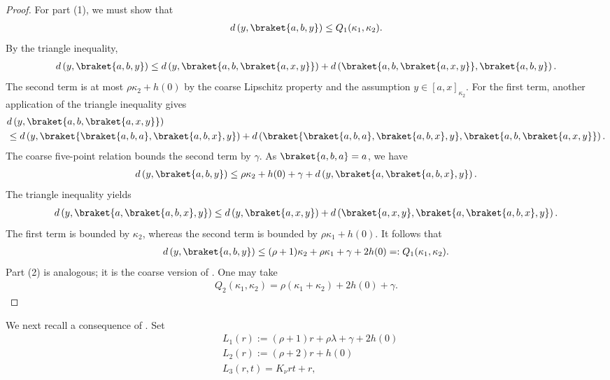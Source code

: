 \documentclass[12pt,reqno]{amsart}
\numberwithin{equation}{section}
\begin{document}
\begin{proof}
    For part (1), we must show that
    \begin{align*}
        d\left(y,\braket{a,b,y}\right)\le Q_1(\kappa_1,\kappa_2).
    \end{align*}
    By the triangle inequality, 
    \begin{align*}
        d\left(y,\braket{a,b,y}\right)\le d\left(y, \braket{a,b,\braket{a,x,y}}\right)+d\left(\braket{a,b,\braket{a,x,y}},\braket{a,b,y}\right).
    \end{align*}
    The second term is at most $\rho\kappa_2+h(0)$ by the coarse Lipschitz property and the assumption $y\in[a,x]_{\kappa_2}$. For the first term, another application of the triangle inequality gives
    \begin{align*}
        &d\left(y, \braket{a,b,\braket{a,x,y}}\right)\\
        &\le d\left(y, \braket{\braket{a,b,a},\braket{a,b,x},y}\right)+d\left(\braket{\braket{a,b,a},\braket{a,b,x},y},\braket{a,b,\braket{a,x,y}}\right).
    \end{align*}
    The coarse five-point relation bounds the second term by $\gamma$. As $\braket{a,b,a}=a$, we have
    \begin{align*}
        d\left(y,\braket{a,b,y}\right)\le \rho \kappa_2+h(0)+\gamma+d\left(y, \braket{a,\braket{a,b,x},y}\right).
    \end{align*}
    The triangle inequality yields
    \begin{align*}
        d\left(y, \braket{a,\braket{a,b,x},y}\right)\le d\left(y, \braket{a,x,y}\right)+d\left(\braket{a,x,y},\braket{a,\braket{a,b,x},y}\right).
    \end{align*}
    The first term is bounded by $\kappa_2$, whereas the second term is bounded by $\rho \kappa_1+h(0)$. It follows that
    \begin{align*}
         d\left(y,\braket{a,b,y}\right)\le (\rho+1)\kappa_2+\rho\kappa_1+\gamma+2h(0)=: Q_1(\kappa_1,\kappa_2).
    \end{align*}
    Part (2) is analogous; it is the coarse version of \cite[Lemma 5.4]{SpakulaWright2017propertyA}. One may take
    \begin{align*}
        Q_2(\kappa_1,\kappa_2)=\rho(\kappa_1+\kappa_2)+2h(0)+\gamma.
    \end{align*}
\end{proof}
We next recall a consequence of \cite{SpakulaWright2017propertyA}. Set
\begin{align*}
    &L_1(r):=(\rho+1)r+\rho \lambda+\gamma+2h(0)\\
    &L_2(r):=(\rho+2)r+h(0)\\
    &L_3(r,t)=K_\nu rt+r,
\end{align*}
\end{document}
